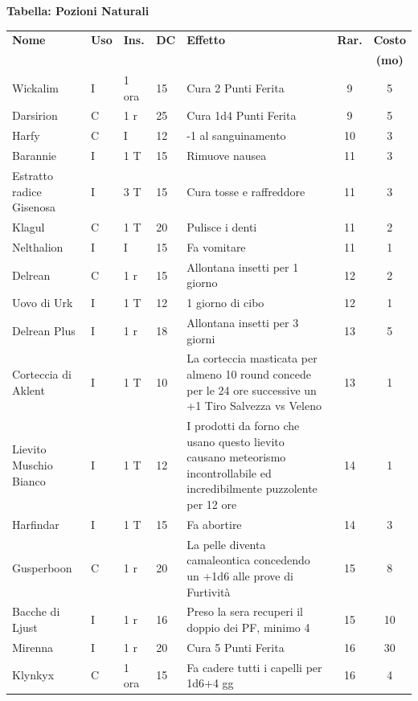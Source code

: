 \medskip

\textbf{Tabella: Pozioni Naturali}\label{tabellapozioni}

\medskip

\noindent\begin{xltabular}{\linewidth}{llllXcc}
	\toprule
 \textbf{Nome}& \textbf{Uso} & \textbf{Ins.} & \textbf{DC} & \textbf{Effetto}& \textbf{Rar.} & \textbf{Costo} \\
 &&&&&&\textbf{(mo)}\\
 	\toprule
	Wickalim & I& 1 ora& 15& Cura 2 Punti Ferita& 9 & 5 \\
 Darsirion & C& 1 r & 25& Cura 1d4 Punti Ferita& 9 & 5 \\
	Harfy & C& I & 12& -1 al sanguinamento& 10 & 3 \\
 Barannie & I& 1 T& 15& Rimuove nausea & 11 & 3 \\
	Estratto radice Gisenosa & I& 3 T& 15& Cura tosse e raffreddore& 11 & 3\\
 Klagul & C& 1 T & 20& Pulisce i denti & 11 & 2 \\
	Nelthalion & I& I& 15& Fa vomitare& 11 & 1\\
 Delrean & C& 1 r & 15& Allontana insetti per 1 giorno & 12 & 2\\
	Uovo di Urk & I& 1 T & 12& 1 giorno di cibo& 12 & 1\\
 Delrean Plus & I& 1 r & 18& Allontana insetti per 3 giorni & 13 & 5\\
	Corteccia di Aklent & I& 1 T & 10& La corteccia masticata per almeno 10 round concede per le 24 ore successive un +1 Tiro Salvezza vs Veleno& 13 & 1\\
 Lievito Muschio Bianco & I& 1 T& 12& I prodotti da forno che usano questo lievito causano meteorismo incontrollabile ed incredibilmente puzzolente per 12 ore & 14 & 1\\
	Harfindar & I& 1 T & 15& Fa abortire& 14 & 3 \\
 Gusperboon & C& 1 r & 20& La pelle diventa camaleontica concedendo un +1d6 alle prove di Furtività & 15 & 8\\
	Bacche di Ljust & I& 1 r & 16& Preso la sera recuperi il doppio dei PF, minimo 4 & 15 & 10 \\
 Mirenna & I& 1 r & 20& Cura 5 Punti Ferita& 16 & 30 \\
	Klynkyx & C& 1 ora & 15& Fa cadere tutti i capelli per 1d6+4 gg & 16 & 4\\

\end{xltabular}
